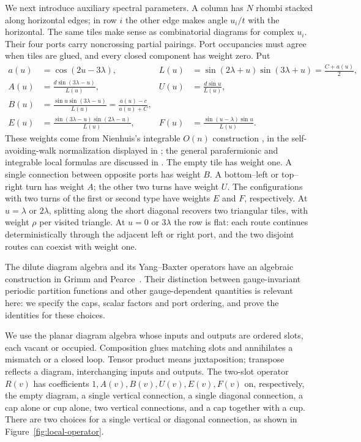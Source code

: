 We next introduce auxiliary spectral parameters. A column has $N$
rhombi stacked along horizontal edges; in row $i$ the other edge makes
angle $u_i/t$ with the horizontal. The same tiles make sense as
combinatorial diagrams for complex $u_i$. Their four ports carry
noncrossing partial pairings. Port occupancies must agree when tiles
are glued, and every closed component has weight zero. Put
\begin{equation}\label{eq:01-rhombic-weights}
\begin{aligned}
 a(u)&=\cos(2u-3\lambda),&
 L(u)&=\sin(2\lambda+u)\sin(3\lambda+u)=\frac{C+a(u)}2,\\
 A(u)&=\frac{d\sin(3\lambda-u)}{L(u)},&
 U(u)&=\frac{d\sin u}{L(u)},\\
 B(u)&=\frac{\sin u\sin(3\lambda-u)}{L(u)}
       =\frac{a(u)-c}{a(u)+C},\\
 E(u)&=\frac{\sin(3\lambda-u)\sin(2\lambda-u)}{L(u)},&
 F(u)&=\frac{\sin(u-\lambda)\sin u}{L(u)}.
\end{aligned}
\end{equation}
These weights come from Nienhuis's integrable $O(n)$ construction
\cite{Nienhuis1990CriticalMulticritical}, in the self-avoiding-walk
normalization displayed in \cite{GM2019}; the general parafermionic and integrable local formulas
are discussed in \cite{IkhlefCardy2009,Glazman2015}.
The empty tile has weight one. A single connection between opposite
ports has weight $B$. A bottom--left or top--right turn has weight $A$;
the other two turns have weight $U$. The configurations with two turns
of the first or second type have weights $E$ and $F$, respectively.
At $u=\lambda$ or $2\lambda$, splitting along the short diagonal recovers
two triangular tiles, with weight $\rho$ per visited triangle. At
$u=0$ or $3\lambda$ the row is flat: each route continues deterministically
through the adjacent left or right port, and the two disjoint routes
can coexist with weight one.

The dilute diagram algebra and its Yang--Baxter operators have an
algebraic construction in Grimm and Pearce~\cite{GrimmPearce1993}.
Their distinction between gauge-invariant periodic partition functions
and other gauge-dependent quantities is relevant here: we specify the caps, scalar factors
and port ordering, and prove the identities for these choices.

We use the planar diagram algebra whose inputs and outputs are ordered
slots, each vacant or occupied. Composition glues matching slots and
annihilates a mismatch or a closed loop. Tensor product means
juxtaposition; transpose reflects a diagram, interchanging inputs and
outputs. The two-slot operator $R(v)$ has coefficients
$1,A(v),B(v),U(v),E(v),F(v)$ on, respectively, the empty diagram, a
single vertical connection, a single diagonal connection, a cap alone
or cup alone, two vertical connections, and a cap together with a cup.
There are two choices for a single vertical or diagonal connection, as
shown in Figure~\ref{fig:local-operator}.


